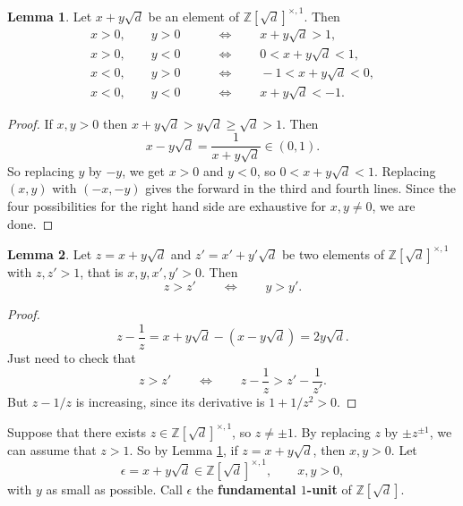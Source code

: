 \documentclass{article}
\newcommand{\Z}{\mathbb{Z}}
\newcommand{\rb}[1]{\left( #1 \right)}
\renewcommand{\sb}[1]{\left[ #1 \right]}
\theoremstyle{definition}\newtheorem{definition}{Definition}
\theoremstyle{definition}\newtheorem{remark}[definition]{Remark}
\theoremstyle{definition}\newtheorem*{example}{Example}
\theoremstyle{definition}\newtheorem*{note}{Note}
\newtheorem{lemma}[definition]{Lemma}
\begin{document}
\begin{lemma}
\label{lem:62}
Let $ x + y\sqrt{d} $ be an element of $ \Z\sb{\sqrt{d}}^{\times, 1} $. Then
\begin{align*}
x > 0, \qquad y > 0 \qquad & \iff \qquad x + y\sqrt{d} > 1, \\
x > 0, \qquad y < 0 \qquad & \iff \qquad 0 < x + y\sqrt{d} < 1, \\
x < 0, \qquad y > 0 \qquad & \iff \qquad -1 < x + y\sqrt{d} < 0, \\
x < 0, \qquad y < 0 \qquad & \iff \qquad x + y\sqrt{d} < -1.
\end{align*}
\end{lemma}

\begin{proof}
If $ x, y > 0 $ then $ x + y\sqrt{d} > y\sqrt{d} \ge \sqrt{d} > 1 $. Then
$$ x - y\sqrt{d} = \dfrac{1}{x + y\sqrt{d}} \in \rb{0, 1}. $$
So replacing $ y $ by $ -y $, we get $ x > 0 $ and $ y < 0 $, so $ 0 < x + y\sqrt{d} < 1 $. Replacing $ \rb{x, y} $ with $ \rb{-x, -y} $ gives the forward in the third and fourth lines. Since the four possibilities for the right hand side are exhaustive for $ x, y \ne 0 $, we are done.
\end{proof}

\begin{lemma}
\label{lem:63}
Let $ z = x + y\sqrt{d} $ and $ z' = x' + y'\sqrt{d} $ be two elements of $ \Z\sb{\sqrt{d}}^{\times, 1} $ with $ z, z' > 1 $, that is $ x, y, x', y' > 0 $. Then
$$ z > z' \qquad \iff \qquad y > y'. $$
\end{lemma}

\begin{proof}
$$ z - \dfrac{1}{z} = x + y\sqrt{d} - \rb{x - y\sqrt{d}} = 2y\sqrt{d}. $$
Just need to check that
$$ z > z' \qquad \iff \qquad z - \dfrac{1}{z} > z' - \dfrac{1}{z'}. $$
But $ z - 1 / z $ is increasing, since its derivative is $ 1 + 1 / z^2 > 0 $.
\end{proof}


Suppose that there exists $ z \in \Z\sb{\sqrt{d}}^{\times, 1} $, so $ z \ne \pm 1 $. By replacing $ z $ by $ \pm z^{\pm 1} $, we can assume that $ z > 1 $. So by Lemma \ref{lem:62}, if $ z = x + y\sqrt{d} $, then $ x, y > 0 $. Let
$$ \epsilon = x + y\sqrt{d} \in \Z\sb{\sqrt{d}}^{\times, 1}, \qquad x, y > 0, $$
with $ y $ as small as possible. Call $ \epsilon $ the \textbf{fundamental $ 1 $-unit} of $ \Z\sb{\sqrt{d}} $.
\end{document}
